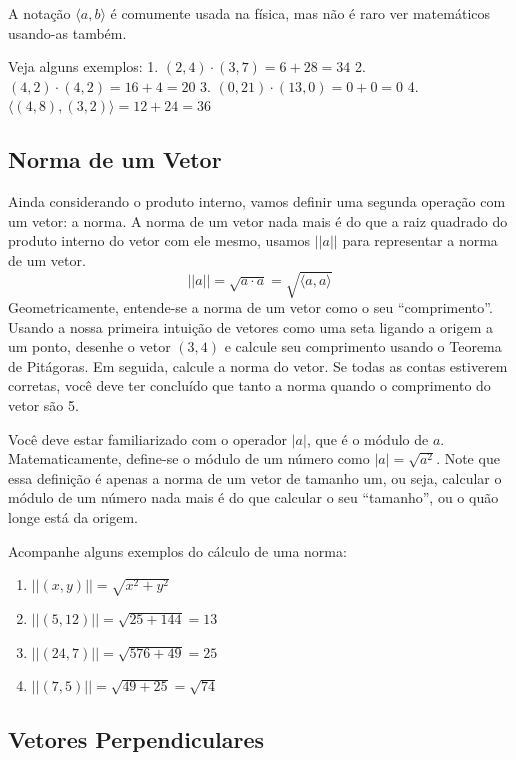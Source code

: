 \documentclass[
  letterpaper,
  DIV=11,
  numbers=noendperiod]{scrreprt}
\providecommand{\tightlist}{%
  \setlength{\itemsep}{0pt}\setlength{\parskip}{0pt}}\usepackage{longtable,booktabs,array}
\begin{document}
A notação \(\langle a,b \rangle\) é comumente usada na física, mas não é
raro ver matemáticos usando-as também.

Veja alguns exemplos: 1. \((2,4) \cdot (3,7) = 6+28=34\) 2.
\((4,2) \cdot (4,2) = 16+4 = 20\) 3. \((0,21) \cdot (13, 0) = 0+0=0\) 4.
\(\langle (4,8),(3,2) \rangle = 12+24=36\)

\subsection{Norma de um Vetor}\label{norma-de-um-vetor}

Ainda considerando o produto interno, vamos definir uma segunda operação
com um vetor: a norma. A norma de um vetor nada mais é do que a raiz
quadrado do produto interno do vetor com ele mesmo, usamos \(|| a ||\)
para representar a norma de um vetor. \[
||a|| = \sqrt{a \cdot a} = \sqrt{\langle a,a \rangle}
\] Geometricamente, entende-se a norma de um vetor como o seu
``comprimento''. Usando a nossa primeira intuição de vetores como uma
seta ligando a origem a um ponto, desenhe o vetor \((3,4)\) e calcule
seu comprimento usando o Teorema de Pitágoras. Em seguida, calcule a
norma do vetor. Se todas as contas estiverem corretas, você deve ter
concluído que tanto a norma quando o comprimento do vetor são 5.

Você deve estar familiarizado com o operador \(|a|\), que é o módulo de
\(a\). Matematicamente, define-se o módulo de um número como
\(|a| = \sqrt{a^2}\). Note que essa definição é apenas a norma de um
vetor de tamanho um, ou seja, calcular o módulo de um número nada mais é
do que calcular o seu ``tamanho'', ou o quão longe está da origem.

Acompanhe alguns exemplos do cálculo de uma norma:

\begin{enumerate}
\def\labelenumi{\arabic{enumi}.}
\tightlist
\item
  \(||(x,y)|| = \sqrt{x^2+y^2}\)
\item
  \(||(5,12)|| = \sqrt{25+144} = 13\)
\item
  \(||(24, 7)|| = \sqrt{576+49}=25\)
\item
  \(||(7,5)|| = \sqrt{49+25}=\sqrt{74}\)
\end{enumerate}

\subsection{Vetores Perpendiculares}\label{vetores-perpendiculares}
\end{document}
